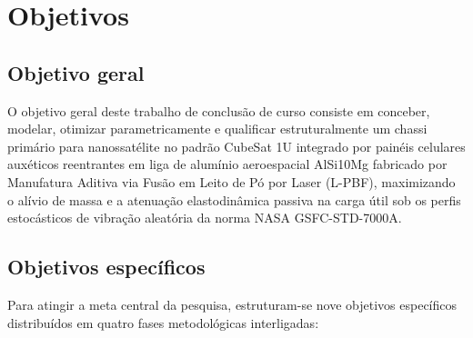 \chapter{Objetivos}
\label{cap:objetivos}

\section{Objetivo geral}
\label{sec:obj-geral}

O objetivo geral deste trabalho de conclusão de curso consiste em conceber, modelar, otimizar parametricamente e qualificar estruturalmente um chassi primário para nanossatélite no padrão CubeSat 1U integrado por painéis celulares auxéticos reentrantes em liga de alumínio aeroespacial AlSi10Mg fabricado por Manufatura Aditiva via Fusão em Leito de Pó por Laser (L-PBF), maximizando o alívio de massa e a atenuação elastodinâmica passiva na carga útil sob os perfis estocásticos de vibração aleatória da norma NASA GSFC-STD-7000A.

\section{Objetivos específicos}
\label{sec:obj-especificos}

Para atingir a meta central da pesquisa, estruturam-se nove objetivos específicos distribuídos em quatro fases metodológicas interligadas:

